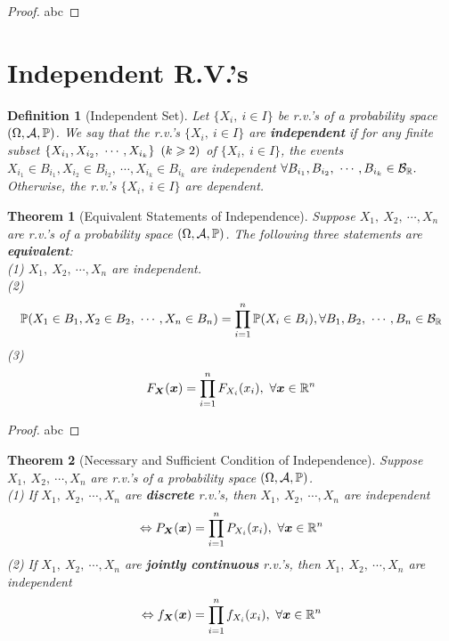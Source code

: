 \documentclass[openany,12pt]{book}
\newtheorem{theorem}{Theorem}[chapter]
\newtheorem{definition}{Definition}[chapter]
\begin{document}
\begin{proof}
  abc
\end{proof}

\section{Independent R.V.'s}

\begin{definition}[Independent Set]
Let $\{X_{i},\ i \in I\}$ be r.v.'s of a probability space $(\Omega,\mathcal{A},\mathbb{P})$. We say that the r.v.'s $\{X_{i},\ i \in I\}$ are \textbf{independent} if for any finite subset
$\left\{ X_{i_{1}},X_{i_{2}},\ \cdots,X_{i_{k}} \right\}\ (k \geqslant 2)$ of $\{ X_{i},\ i \in I\}$, the events $X_{i_{1}} \in B_{i_{1}},X_{i_{2}} \in B_{i_{2}},\ \cdots,X_{i_{k}} \in B_{i_{k}}$ are independent $\forall B_{i_{1}},B_{i_{2}},\ \cdots,B_{i_{k}} \in \mb_{\mathbb{R}}.$ Otherwise, the r.v.'s $\{X_{i},\ i \in I\}$ are dependent.
\end{definition}

\begin{theorem}[Equivalent Statements of Independence]
Suppose $X_{1},\ X_{2},\ \cdots,X_{n}$ are r.v.'s of a probability space $(\Omega,\mathcal{A},\mathbb{P})$. The following three statements are \textbf{equivalent}:\\
(1) $X_{1},\ X_{2},\ \cdots,X_{n}$ are independent.\\
(2)
\[\mathbb{P}( X_{1} \in B_{1},X_{2} \in B_{2},\ \cdots,X_{n} \in B_{n}) = \prod_{i = 1}^{n}{\mathbb{P}(X_{i} \in B_{i})},\forall B_{1},B_{2},\ \cdots,B_{n} \in \mathcal{B}_{\mathbb{R}}\]
(3)
\[F_{\bm{X}}(\bm{x}) = \prod_{i = 1}^{n}{F_{X_{i}}(x_{i})},\ \forall \bm{x}\in \mathbb{R}^{n}\]
\end{theorem}

\begin{proof}
  abc
\end{proof}

\begin{theorem}[Necessary and Sufficient Condition of Independence]
Suppose $X_{1},\ X_{2},\ \cdots,X_{n}$ are r.v.'s of a probability
space $(\Omega,\mathcal{A},\mathbb{P})$.\\
(1) If $X_{1},\ X_{2},\ \cdots,X_{n}$ are \textbf{discrete} r.v.'s, then $X_{1},\ X_{2},\ \cdots,X_{n}$ are independent
\[\Leftrightarrow P_{\bm{X}}(\bm{x}) = \prod_{i = 1}^{n}{P_{X_{i}}(x_{i})},\ \forall\bm{x} \in \mathbb{R}^{n}\]
(2) If $X_{1},\ X_{2},\ \cdots,X_{n}$ are \textbf{jointly continuous}
r.v.'s, then $X_{1},\ X_{2},\ \cdots,X_{n}$ are independent
\[\Leftrightarrow f_{\bm{X}}(\bm{x}) = \prod_{i = 1}^{n}{f_{X_{i}}(x_{i})},\ \forall \bm{x}\in \mathbb{R}^{n}\]
\end{theorem}
\end{document}

